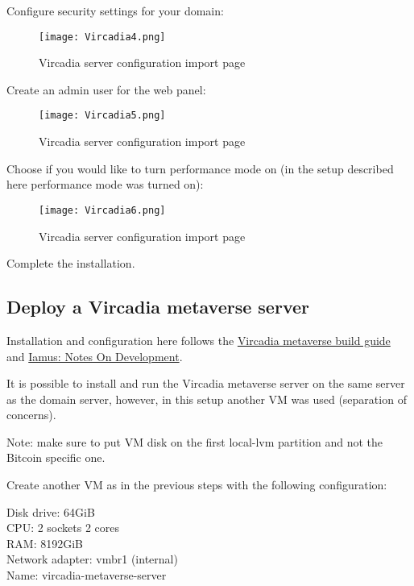 Configure security settings for your domain:

\begin{figure}
\centering
\texttt{[image: Vircadia4.png]}
\caption{Vircadia server configuration import page}
\end{figure}

Create an admin user for the web panel:

\begin{figure}
\centering
\texttt{[image: Vircadia5.png]}
\caption{Vircadia server configuration import page}
\end{figure}

Choose if you would like to turn performance mode on (in the setup
described here performance mode was turned on):

\begin{figure}
\centering
\texttt{[image: Vircadia6.png]}
\caption{Vircadia server configuration import page}
\end{figure}

Complete the installation.

\hypertarget{deploy-a-vircadia-metaverse-server}{%
\subsection{Deploy a Vircadia metaverse
server}\label{deploy-a-vircadia-metaverse-server}}

Installation and configuration here follows the
\href{https://github.com/vircadia/vircadia-metaverse/blob/master/docs/Building.md}{Vircadia
metaverse build guide} and
\href{https://github.com/vircadia/vircadia-metaverse/blob/master/docs/NotesOnDevelopment.md}{Iamus:
Notes On Development}.

It is possible to install and run the Vircadia metaverse server on the
same server as the domain server, however, in this setup another VM was
used (separation of concerns).

Note: make sure to put VM disk on the first local-lvm partition and not
the Bitcoin specific one.

Create another VM as in the previous steps with the following
configuration:

Disk drive: 64GiB\\
CPU: 2 sockets 2 cores\\
RAM: 8192GiB\\
Network adapter: vmbr1 (internal)\\
Name: vircadia-metaverse-server

